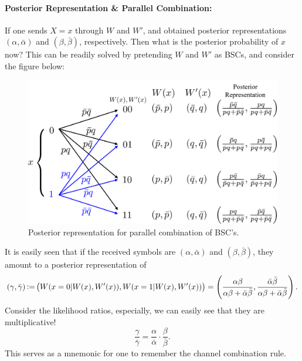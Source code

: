 \paragraph{Posterior Representation \& Parallel Combination:}

If one sends $X=x$ through $W$ and $W'$, and obtained posterior representations $(\alpha,\bar{\alpha})$ and $(\beta,\bar{\beta})$, respectively. Then what is the posterior probability of $x$ now? This can be readily solved by pretending $W$ and $W'$ as BSCs, and consider the figure below:
\begin{figure}[H]
    \centering
    \includegraphics[width=0.7\linewidth]{figures/w5_post_parallel.png}
    \caption{Posterior representation for parallel combination of BSC's.}
\end{figure}
It is easily seen that if the received symbols are $(\alpha,\bar{\alpha})$ and $(\beta,\bar{\beta})$, they amount to a posterior representation of
\begin{equation}
    (\gamma,\bar{\gamma}) \operatorname{\vcentcolon=} \left(W(x=0\vert W(x),W'(x)), W(x=1\vert W(x),W'(x))\right) = \left(\frac{\alpha\beta}{\alpha\beta + \bar{\alpha}\bar{\beta}} , \frac{\bar{\alpha}\bar{\beta}}{\alpha\beta + \bar{\alpha}\bar{\beta}}\right).
\end{equation}
Consider the likelihood ratios, especially, we can easily see that they are multiplicative!
\begin{equation}
    \frac{\gamma}{\bar{\gamma}} = \frac{\alpha}{\bar{\alpha}} \cdot \frac{\beta}{\bar{\beta}}.
\end{equation}
This serves as a mnemonic for one to remember the channel combination rule.

